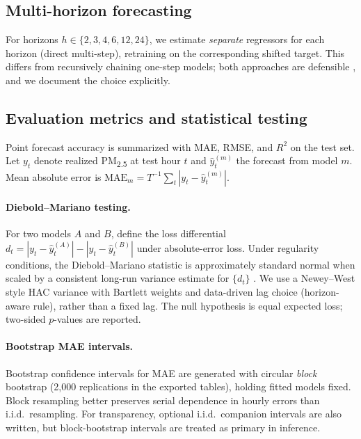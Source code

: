 \documentclass[11pt,a4paper]{article}
\begin{document}
\subsection{Multi-horizon forecasting}

For horizons $h\in\{2,3,4,6,12,24\}$, we estimate \emph{separate} regressors for each horizon (direct multi-step), retraining on the corresponding shifted target. This differs from recursively chaining one-step models; both approaches are defensible \citep{marcellino2006comparison}, and we document the choice explicitly.

\subsection{Evaluation metrics and statistical testing}

Point forecast accuracy is summarized with MAE, RMSE, and $R^2$ on the test set. Let $y_t$ denote realized PM\textsubscript{2.5} at test hour $t$ and $\hat{y}_t^{(m)}$ the forecast from model $m$. Mean absolute error is $\mathrm{MAE}_m = T^{-1}\sum_t |y_t - \hat{y}_t^{(m)}|$.

\paragraph{Diebold--Mariano testing.}
For two models $A$ and $B$, define the loss differential $d_t = |y_t - \hat{y}_t^{(A)}| - |y_t - \hat{y}_t^{(B)}|$ under absolute-error loss. Under regularity conditions, the Diebold--Mariano statistic is approximately standard normal when scaled by a consistent long-run variance estimate for $\{d_t\}$ \citep{diebold1995comparing}. We use a Newey--West style HAC variance with Bartlett weights and data-driven lag choice (horizon-aware rule), rather than a fixed lag. The null hypothesis is equal expected loss; two-sided $p$-values are reported.

\paragraph{Bootstrap MAE intervals.}
Bootstrap confidence intervals for MAE are generated with circular \emph{block} bootstrap (2{,}000 replications in the exported tables), holding fitted models fixed. Block resampling better preserves serial dependence in hourly errors than i.i.d.\ resampling. For transparency, optional i.i.d.\ companion intervals are also written, but block-bootstrap intervals are treated as primary in inference.
\end{document}
